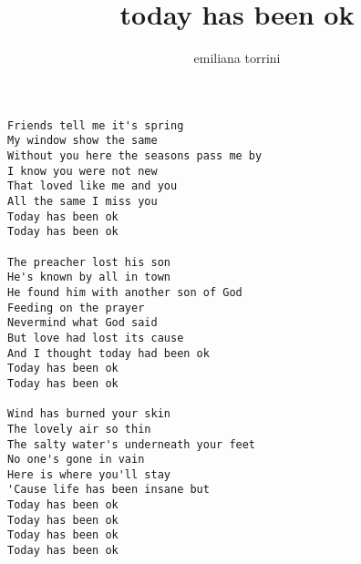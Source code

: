 \author{emiliana torrini}
\title{today has been ok}
\maketitle
\begin{verbatim}
Friends tell me it's spring
My window show the same
Without you here the seasons pass me by
I know you were not new
That loved like me and you
All the same I miss you
Today has been ok
Today has been ok

The preacher lost his son
He's known by all in town
He found him with another son of God
Feeding on the prayer
Nevermind what God said
But love had lost its cause
And I thought today had been ok
Today has been ok
Today has been ok

Wind has burned your skin
The lovely air so thin
The salty water's underneath your feet
No one's gone in vain
Here is where you'll stay
'Cause life has been insane but
Today has been ok
Today has been ok
Today has been ok
Today has been ok
\end{verbatim}